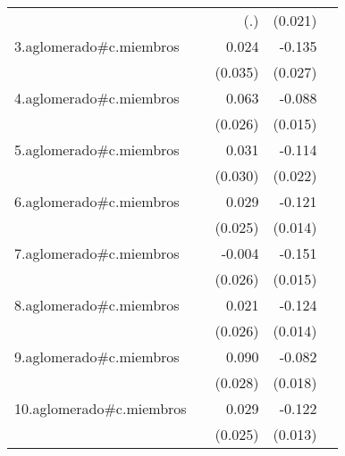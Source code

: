{\begin{longtable}{l*{4}{D{.}{.}{-1}}}
            &                     &         (.)         &     (0.021)         &                     \\
\addlinespace
3.aglomerado#c.miembros&                     &       0.024         &      -0.135\sym{***}&                     \\
            &                     &     (0.035)         &     (0.027)         &                     \\
\addlinespace
4.aglomerado#c.miembros&                     &       0.063\sym{*}  &      -0.088\sym{***}&                     \\
            &                     &     (0.026)         &     (0.015)         &                     \\
\addlinespace
5.aglomerado#c.miembros&                     &       0.031         &      -0.114\sym{***}&                     \\
            &                     &     (0.030)         &     (0.022)         &                     \\
\addlinespace
6.aglomerado#c.miembros&                     &       0.029         &      -0.121\sym{***}&                     \\
            &                     &     (0.025)         &     (0.014)         &                     \\
\addlinespace
7.aglomerado#c.miembros&                     &      -0.004         &      -0.151\sym{***}&                     \\
            &                     &     (0.026)         &     (0.015)         &                     \\
\addlinespace
8.aglomerado#c.miembros&                     &       0.021         &      -0.124\sym{***}&                     \\
            &                     &     (0.026)         &     (0.014)         &                     \\
\addlinespace
9.aglomerado#c.miembros&                     &       0.090\sym{**} &      -0.082\sym{***}&                     \\
            &                     &     (0.028)         &     (0.018)         &                     \\
\addlinespace
10.aglomerado#c.miembros&                     &       0.029         &      -0.122\sym{***}&                     \\
            &                     &     (0.025)         &     (0.013)         &                     \\

\end{longtable}}
